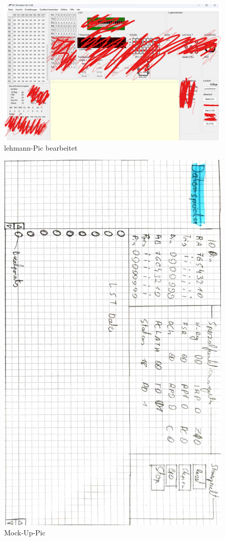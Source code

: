 \begin{figure}[h!]
    \centering
    \includegraphics[width=12cm]{input/Screenshot 2023-05-09 111703.png}
    \caption{lehmann-Pic bearbeitet}
    \label{fig:meine-grafik}
\end{figure}

\begin{figure}[h!]
    \centering
    \includegraphics[angle=90,width=12cm]{input/Mock-up-Pic.jpg}
    \caption{Mock-Up-Pic}
    \label{fig:mock-up.pic}
\end{figure}
   
